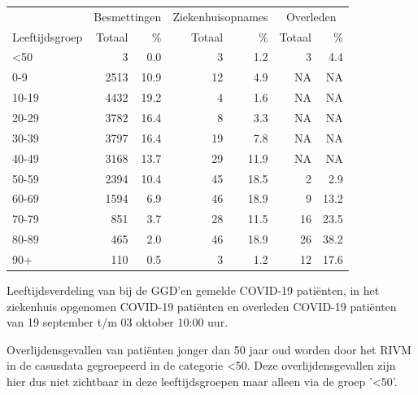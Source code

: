 \documentclass[
  english,
  man,floatsintext]{apa6}
\begin{document}
\begin{table}
\centering\begingroup\fontsize{11}{13}\selectfont

\begin{threeparttable}
\begin{tabular}{lrrrrrr}
\toprule
\multicolumn{1}{c}{ } & \multicolumn{2}{c}{Besmettingen} & \multicolumn{2}{c}{Ziekenhuisopnames} & \multicolumn{2}{c}{Overleden} \\
\cmidrule(l{3pt}r{3pt}){2-3} \cmidrule(l{3pt}r{3pt}){4-5} \cmidrule(l{3pt}r{3pt}){6-7}
Leeftijdsgroep & Totaal & \% & Totaal & \% & Totaal & \%\\
\midrule
<50 & 3 & 0.0 & 3 & 1.2 & 3 & 4.4\\
0-9 & 2513 & 10.9 & 12 & 4.9 & NA & NA\\
10-19 & 4432 & 19.2 & 4 & 1.6 & NA & NA\\
20-29 & 3782 & 16.4 & 8 & 3.3 & NA & NA\\
30-39 & 3797 & 16.4 & 19 & 7.8 & NA & NA\\
40-49 & 3168 & 13.7 & 29 & 11.9 & NA & NA\\
50-59 & 2394 & 10.4 & 45 & 18.5 & 2 & 2.9\\
60-69 & 1594 & 6.9 & 46 & 18.9 & 9 & 13.2\\
70-79 & 851 & 3.7 & 28 & 11.5 & 16 & 23.5\\
80-89 & 465 & 2.0 & 46 & 18.9 & 26 & 38.2\\
90+ & 110 & 0.5 & 3 & 1.2 & 12 & 17.6\\
\bottomrule
\end{tabular}
\begin{tablenotes}
\item[1] Leeftijdsverdeling van bij de GGD’en gemelde COVID-19 patiënten, in het ziekenhuis opgenomen COVID-19 patiënten en overleden COVID-19 patiënten van 19 september t/m 03 oktober 10:00 uur.
\item[2] Overlijdensgevallen van patiënten jonger dan 50 jaar oud worden door het RIVM in de casusdata gegroepeerd in de categorie <50. Deze overlijdensgevallen zijn hier dus niet zichtbaar in deze leeftijdsgroepen maar alleen via de groep '<50'.
\end{tablenotes}
\end{threeparttable}
\endgroup{}
\end{table}

\newpage
\end{document}

